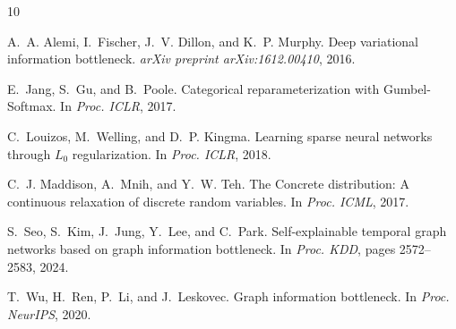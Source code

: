 \documentclass[11pt,a4paper]{article}
\begin{document}

\begin{thebibliography}{10}

A.~A. Alemi, I.~Fischer, J.~V. Dillon, and K.~P. Murphy.
\newblock Deep variational information bottleneck.
\newblock \emph{arXiv preprint arXiv:1612.00410}, 2016.

E.~Jang, S.~Gu, and B.~Poole.
\newblock Categorical reparameterization with {Gumbel}-Softmax.
\newblock In \emph{Proc. ICLR}, 2017.

C.~Louizos, M.~Welling, and D.~P. Kingma.
\newblock Learning sparse neural networks through $L_0$ regularization.
\newblock In \emph{Proc. ICLR}, 2018.

C.~J. Maddison, A.~Mnih, and Y.~W. Teh.
\newblock The {Concrete} distribution: A continuous relaxation of discrete
  random variables.
\newblock In \emph{Proc. ICML}, 2017.

S.~Seo, S.~Kim, J.~Jung, Y.~Lee, and C.~Park.
\newblock Self-explainable temporal graph networks based on graph
  information bottleneck.
\newblock In \emph{Proc. KDD}, pages 2572--2583, 2024.

T.~Wu, H.~Ren, P.~Li, and J.~Leskovec.
\newblock Graph information bottleneck.
\newblock In \emph{Proc. NeurIPS}, 2020.

\end{thebibliography}
\end{document}

